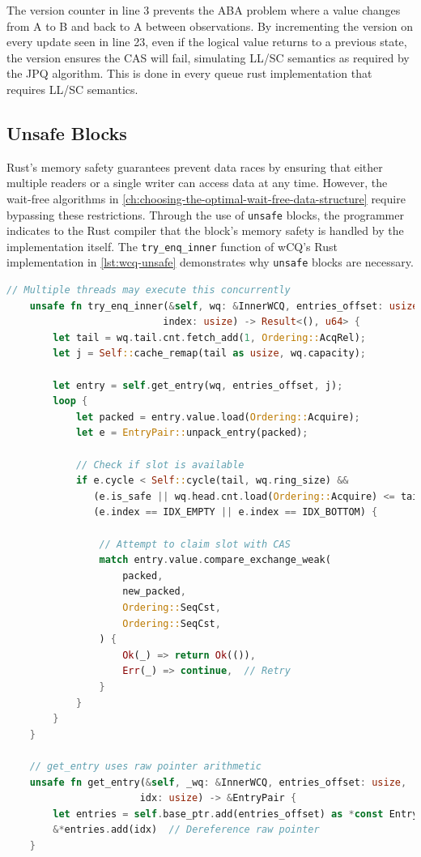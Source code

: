 The version counter in line 3 prevents the ABA problem where a value changes from A to B and back to A between observations. By incrementing the version on every update seen in line 23, even if the logical value returns to a previous state, the version ensures the \ac{CAS} will fail, simulating \ac{LL/SC} semantics as required by the \ac{JPQ} algorithm. This is done in every queue rust implementation that requires \ac{LL/SC} semantics.

\subsection{Unsafe Blocks}

Rust's memory safety guarantees prevent data races by ensuring that either multiple readers or a single writer can access data at any time. However, the wait-free algorithms in \cref{ch:choosing-the-optimal-wait-free-data-structure} require bypassing these restrictions. Through the use of \texttt{unsafe} blocks, the programmer indicates to the Rust compiler that the block's memory safety is handled by the implementation itself. The \texttt{try\_enq\_inner} function of \ac{wCQ}'s Rust implementation in \cref{lst:wcq-unsafe} demonstrates why \texttt{unsafe} blocks are necessary.

\begin{lstlisting}[language=Rust, style=boxed, caption={Wait-free synchronisation requiring unsafe}, label={lst:wcq-unsafe}]
    // Multiple threads may execute this concurrently
    unsafe fn try_enq_inner(&self, wq: &InnerWCQ, entries_offset: usize,
                           index: usize) -> Result<(), u64> {
        let tail = wq.tail.cnt.fetch_add(1, Ordering::AcqRel);
        let j = Self::cache_remap(tail as usize, wq.capacity);
        
        let entry = self.get_entry(wq, entries_offset, j);
        loop {
            let packed = entry.value.load(Ordering::Acquire);
            let e = EntryPair::unpack_entry(packed);
            
            // Check if slot is available
            if e.cycle < Self::cycle(tail, wq.ring_size) &&
               (e.is_safe || wq.head.cnt.load(Ordering::Acquire) <= tail) &&
               (e.index == IDX_EMPTY || e.index == IDX_BOTTOM) {
                
                // Attempt to claim slot with CAS
                match entry.value.compare_exchange_weak(
                    packed,
                    new_packed,
                    Ordering::SeqCst,
                    Ordering::SeqCst,
                ) {
                    Ok(_) => return Ok(()),
                    Err(_) => continue,  // Retry
                }
            }
        }
    }
    
    // get_entry uses raw pointer arithmetic
    unsafe fn get_entry(&self, _wq: &InnerWCQ, entries_offset: usize, 
                       idx: usize) -> &EntryPair {
        let entries = self.base_ptr.add(entries_offset) as *const EntryPair;
        &*entries.add(idx)  // Dereference raw pointer
    }
\end{lstlisting}

